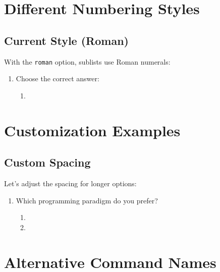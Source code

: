 \documentclass[11pt]{article}
\begin{document}
\section{Different Numbering Styles}

\subsection{Current Style (Roman)}
With the \texttt{roman} option, sublists use Roman numerals:

\setenumsublabelwidth{3em}
\setenumsubitemwidth{3cm}
\begin{enumerate}[label=\textbf{\arabic*.}]
  \item Choose the correct answer:
  \begin{enumerate}[label=\textbf{(\alph*)}]
    \item {}
  \end{enumerate}
\end{enumerate}


\section{Customization Examples}

\subsection{Custom Spacing}

Let's adjust the spacing for longer options:

\setenumsublabelwidth{2em}
\setenumsubitemwidth{6cm}

\begin{enumerate}[mainq]
  \item Which programming paradigm do you prefer?
  \begin{enumerate}[subq]
    \item {}
    \item {}
  \end{enumerate}
\end{enumerate}

\setenumsublabelwidth{2.2em}
\setenumsubitemwidth{1.5cm}

\section{Alternative Command Names}
\end{document}
